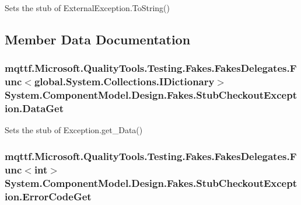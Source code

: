 Sets the stub of External\-Exception.\-To\-String()



\subsection{Member Data Documentation}
\hypertarget{class_system_1_1_component_model_1_1_design_1_1_fakes_1_1_stub_checkout_exception_aa7b7eed26ce29f8cbb80f0ffc5977c2d}{
\subsubsection[{Data\-Get}]{\setlength{\rightskip}{0pt plus 5cm}mqttf.\-Microsoft.\-Quality\-Tools.\-Testing.\-Fakes.\-Fakes\-Delegates.\-Func$<$global.\-System.\-Collections.\-I\-Dictionary$>$ System.\-Component\-Model.\-Design.\-Fakes.\-Stub\-Checkout\-Exception.\-Data\-Get}}\label{class_system_1_1_component_model_1_1_design_1_1_fakes_1_1_stub_checkout_exception_aa7b7eed26ce29f8cbb80f0ffc5977c2d}


Sets the stub of Exception.\-get\-\_\-\-Data()

\hypertarget{class_system_1_1_component_model_1_1_design_1_1_fakes_1_1_stub_checkout_exception_aceff1d11cd4d0b7891ae15737428ed7e}{
\subsubsection[{Error\-Code\-Get}]{\setlength{\rightskip}{0pt plus 5cm}mqttf.\-Microsoft.\-Quality\-Tools.\-Testing.\-Fakes.\-Fakes\-Delegates.\-Func$<$int$>$ System.\-Component\-Model.\-Design.\-Fakes.\-Stub\-Checkout\-Exception.\-Error\-Code\-Get}}\label{class_system_1_1_component_model_1_1_design_1_1_fakes_1_1_stub_checkout_exception_aceff1d11cd4d0b7891ae15737428ed7e}


